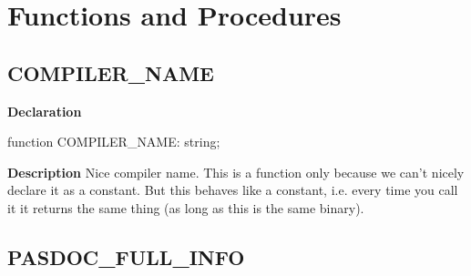 \documentclass{report}
\newif\ifpdf
\begin{document}
\section{Functions and Procedures}
\ifpdf
\subsection*{\large{\textbf{COMPILER{\_}NAME}}\normalsize\hspace{1ex}\hrulefill}
\else
\subsection*{COMPILER{\_}NAME}
\fi
\label{PasDoc_Versions-COMPILER_NAME}
\begin{list}{}{
\setlength{\itemindent}{0cm}
\setlength{\listparindent}{0cm}
\setlength{\leftmargin}{\evensidemargin}
\addtolength{\leftmargin}{\tmplength}
\settowidth{\labelsep}{X}
\addtolength{\leftmargin}{\labelsep}
\setlength{\labelwidth}{\tmplength}
}
\item[\textbf{Declaration}\hfill]
\ifpdf
\begin{flushleft}
\fi
\begin{ttfamily}
function COMPILER{\_}NAME: string;\end{ttfamily}

\ifpdf
\end{flushleft}
\fi

\par
\item[\textbf{Description}]
Nice compiler name. This is a function only because we can't nicely declare it as a constant. But this behaves like a constant, i.e. every time you call it it returns the same thing (as long as this is the same binary).

\end{list}
\ifpdf
\subsection*{\large{\textbf{PASDOC{\_}FULL{\_}INFO}}\normalsize\hspace{1ex}\hrulefill}
\else
\end{document}
